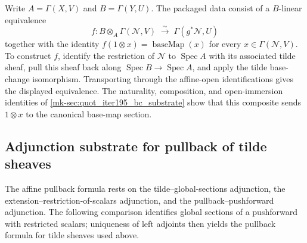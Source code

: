 \begin{definition}\label{mk-def:pullback_app_isoTensor_sigma}
  \leanok

  Write \(A=\Gamma(X,V)\) and \(B=\Gamma(Y,U)\). The packaged data consist
  of a \(B\)-linear equivalence
  \[
    f : B\otimes_A\Gamma(\mathcal N,V)
      \;\xrightarrow{\sim}\; \Gamma(g^*\mathcal N,U)
  \]
  together with the identity
  \(f(1\otimes x)=\operatorname{baseMap}(x)\) for every
  \(x\in\Gamma(\mathcal N,V)\). To construct \(f\), identify the
  restriction of \(\mathcal N\) to \(\operatorname{Spec} A\) with its
  associated tilde sheaf, pull this sheaf back along
  \(\operatorname{Spec} B\to\operatorname{Spec} A\), and apply the tilde
  base-change isomorphism. Transporting through the affine-open
  identifications gives the displayed equivalence. The naturality,
  composition, and open-immersion identities of
  \ref{mk-sec:quot_iter195_bc_substrate} show that this composite sends
  \(1\otimes x\) to the canonical base-map section.
\end{definition}

\subsection{Adjunction substrate for pullback of tilde sheaves}
\label{mk-sec:quot_analogist_gaps}

The affine pullback formula rests on the tilde--global-sections adjunction,
the extension--restriction-of-scalars adjunction, and the
pullback--pushforward adjunction. The following comparison identifies global
sections of a pushforward with restricted scalars; uniqueness of left
adjoints then yields the pullback formula for tilde sheaves used above.

